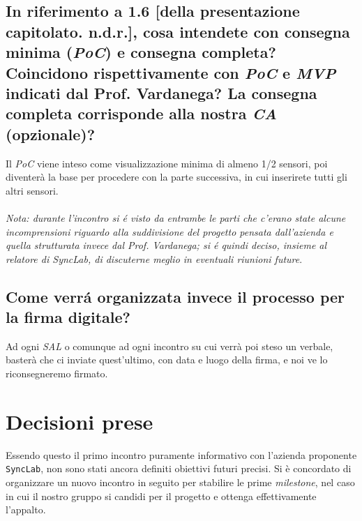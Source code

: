 \subsection{In riferimento a 1.6 [della presentazione capitolato. n.d.r.], cosa intendete con consegna minima (\textit{PoC}) e consegna completa? Coincidono rispettivamente con \textit{PoC} e \textit{MVP} indicati dal Prof. Vardanega? La consegna completa corrisponde alla nostra \textit{CA} (opzionale)?}
Il \textit{PoC} viene inteso come visualizzazione minima di almeno 1/2 sensori, poi diventerà la base per procedere con la parte successiva, in cui  inserirete tutti gli altri sensori.\\\\
\emph{Nota: durante l'incontro si é visto da entrambe le parti che c'erano state alcune incomprensioni riguardo alla suddivisione del progetto pensata dall'azienda e quella strutturata invece dal Prof. Vardanega; si é quindi deciso, insieme al relatore di SyncLab, di discuterne meglio in eventuali riunioni future}.
\subsection{Come verrá organizzata invece il processo per la firma digitale?}
Ad ogni \textit{SAL} o comunque ad ogni incontro su cui verrà poi steso un verbale, basterà che ci inviate quest'ultimo, con data e luogo della firma, e noi ve lo riconsegneremo firmato.

\section{Decisioni prese}
Essendo questo il primo incontro puramente informativo con l'azienda proponente \texttt{SyncLab}, non sono stati ancora definiti obiettivi futuri precisi. Si è concordato di organizzare un nuovo incontro in seguito per stabilire le prime \textit{milestone}, nel caso in cui il nostro gruppo si candidi per il progetto e ottenga effettivamente l'appalto.\\\\



